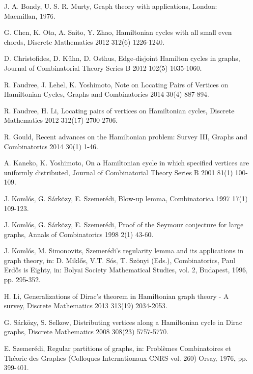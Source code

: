 \documentclass[11pt]{article}
\begin{document}
\begin{thebibliography}{99}

J. A. Bondy, U. S. R. Murty, Graph theory with applications, London: Macmillan, 1976.

G. Chen, K. Ota, A. Saito, Y. Zhao, Hamiltonian cycles with all small even chords, Discrete Mathematics 2012 312(6) 1226-1240.

D. Christofides, D. K\"{u}hn, D. Osthus, Edge-disjoint Hamilton cycles in graphs, Journal of Combinatorial Theory Series B 2012 102(5) 1035-1060.

R. Faudree, J. Lehel, K. Yoshimoto, Note on Locating Pairs of Vertices on Hamiltonian Cycles, Graphs and Combinatorics 2014 30(4) 887-894.

R. Faudree, H. Li, Locating pairs of vertices on Hamiltonian cycles, Discrete Mathematics 2012 312(17) 2700-2706.

R. Gould, Recent advances on the Hamiltonian problem: Survey III, Graphs and Combinatorics 2014 30(1) 1-46.

A. Kaneko, K. Yoshimoto, On a Hamiltonian cycle in which specified vertices are uniformly distributed, Journal of Combinatorial Theory Series B 2001 81(1) 100-109.

J. Koml\'{o}s, G. S\'{a}rk\"{o}zy, E. Szemer\'{e}di, Blow-up lemma, Combinatorica 1997 17(1) 109-123.

J. Koml\'{o}s, G. S\'{a}rk\"{o}zy, E. Szemer\'{e}di, Proof of the Seymour conjecture for large graphs, Annals of Combinatorics 1998 2(1) 43-60.

J. Koml\'{o}s, M. Simonovits, Szemer\'{e}di's regularity lemma and its applications in graph theory, in: D. Mikl\H{o}s, V.T. S\'{o}s, T. Sz\"{o}nyi (Eds.), Combinatorics, Paul Erd\H{o}s is Eighty, in: Bolyai Society Mathematical Studies, vol. 2, Budapest, 1996, pp. 295-352.

H. Li, Generalizations of Dirac’s theorem in Hamiltonian graph theory - A survey, Discrete Mathematics 2013 313(19) 2034-2053.

G. S\'{a}rk\"{o}zy, S. Selkow, Distributing vertices along a Hamiltonian cycle in Dirac graphs, Discrete Mathematics 2008 308(23) 5757-5770.

E. Szemer\'{e}di, Regular partitions of graphs, in: Probl\`{e}mes Combinatoires et Th\'{e}orie des Graphes (Colloques Internationaux CNRS vol. 260) Orsay, 1976, pp. 399-401.

\end{thebibliography}
\end{document}
